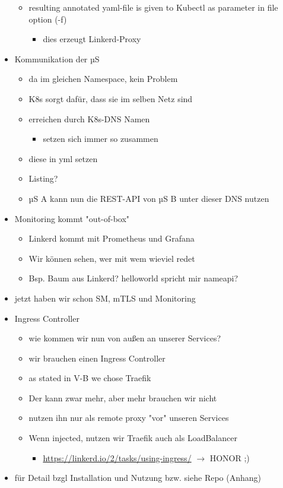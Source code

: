 \begin{itemize}
\begin{itemize}
\begin{itemize}
\begin{itemize}
\end{itemize}
\end{itemize}
	\item resulting annotated yaml-file is given to Kubectl as parameter in file option (-f)
\begin{itemize}
	\item dies erzeugt Linkerd-Proxy
\end{itemize}
\end{itemize}
	\item Kommunikation der µS
\begin{itemize}
	\item da im gleichen Namespace, kein Problem
	\item K8s sorgt dafür, dass sie im selben Netz sind
	\item erreichen durch K8s-DNS Namen
\begin{itemize}
	\item setzen sich immer so zusammen
\end{itemize}
	\item diese in yml setzen
	\item Listing?
	\item µS A kann nun die REST-API von µS B unter dieser DNS nutzen
\end{itemize}
	\item Monitoring kommt "out-of-box"
\begin{itemize}
	\item Linkerd kommt mit Prometheus und Grafana
	\item Wir können sehen, wer mit wem wieviel redet
	\item Bsp. Baum aus Linkerd? helloworld spricht mir nameapi?
\end{itemize}
	\item jetzt haben wir schon SM, mTLS und Monitoring 
	\item Ingress Controller
\begin{itemize}
	\item wie kommen wir nun von außen an unserer Services?
	\item wir brauchen einen Ingress Controller
	\item as stated in V-B we chose Traefik
	\item Der kann zwar mehr, aber mehr brauchen wir nicht 
	\item nutzen ihn nur als remote proxy "vor" unseren Services
	\item Wenn injected, nutzen wir Traefik auch als LoadBalancer
\begin{itemize}
	\item \url{https://linkerd.io/2/tasks/using-ingress/} $\rightarrow$ HONOR ;)
\end{itemize}
\end{itemize}
	\item für Detail bzgl Installation und Nutzung bzw. siehe Repo (Anhang)
\end{itemize}



